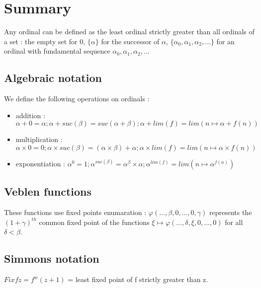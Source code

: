 \documentclass[10pt]{article}
\begin{document}
\section{Summary}

Any ordinal can be defined as the least ordinal strictly greater than all ordinals of a set : the empty set for 0, \(\lbrace \alpha \rbrace\) for the successor of \( \alpha \),  \(\lbrace \alpha_0,\alpha_1,\alpha_2,...\rbrace\) for an ordinal with fundamental sequence \(\alpha_0, \alpha_1, \alpha_2, ...\)

\subsection{Algebraic notation}

We define the following operations on ordinals :

\smallskip
\begin{itemize}
     \setlength{\itemsep}{1pt}
     \setlength{\parskip}{0pt}
     \setlength{\parsep}{0pt}
\item addition : \( \alpha+0=\alpha ; \alpha+suc(\beta)=suc(\alpha+\beta); \alpha+lim(f)=lim(n \mapsto \alpha+f(n)) \)

\item multiplication : \( \alpha \times 0 = 0 ; \alpha \times suc(\beta) = (\alpha \times \beta) + \alpha ; \alpha \times lim(f) = lim (n \mapsto \alpha \times f(n)) \)

\item exponentiation : \( \alpha^0 = 1 ; \alpha^{suc(\beta)} = \alpha^\beta \times \alpha ; \alpha^{lim(f)} = lim (n \mapsto \alpha^{f(n)}) \)
\end{itemize}


\subsection{Veblen functions}

These functions use fixed points enumaration : \(\varphi(\ldots,\beta,0,\ldots,0,\gamma) \) represents the \((1+\gamma)^{th}\) common fixed point of the functions \( \xi \mapsto \varphi(\ldots,\delta,\xi,0,\ldots,0)\) for all \(\delta < \beta\).


\subsection{Simmons notation}

\( Fix f z = f^w(z+1)\) = least fixed point of f strictly greater than z.
\end{document}
